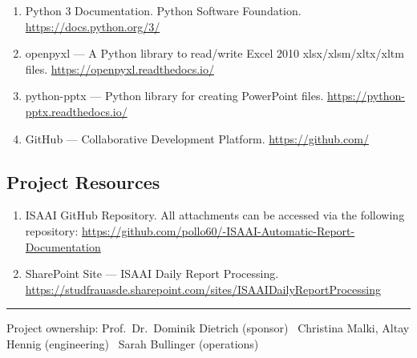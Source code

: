 \documentclass[11pt,a4paper]{article}
\begin{document}
\begin{enumerate}[leftmargin=*, nosep]
  \item Python 3 Documentation. Python Software Foundation. \url{https://docs.python.org/3/}
  \item openpyxl --- A Python library to read/write Excel 2010 xlsx/xlsm/xltx/xltm files. \url{https://openpyxl.readthedocs.io/}
  \item python-pptx --- Python library for creating PowerPoint files. \url{https://python-pptx.readthedocs.io/}
  \item GitHub --- Collaborative Development Platform. \url{https://github.com/}
\end{enumerate}

\subsection{Project Resources}

\begin{enumerate}[leftmargin=*, nosep]
  \item ISAAI GitHub Repository. All attachments can be accessed via the following repository: \url{https://github.com/pollo60/-ISAAI-Automatic-Report-Documentation}
  \item SharePoint Site --- ISAAI Daily Report Processing. \url{https://studfrauasde.sharepoint.com/sites/ISAAIDailyReportProcessing}
\end{enumerate}
\endgroup

\vfill
\hrule
\small\color{ISAAIMuted}
Project ownership: Prof.\ Dr.\ Dominik Dietrich (sponsor) \textbar\
Christina Malki, Altay Hennig (engineering) \textbar\
Sarah Bullinger (operations)
\end{document}
